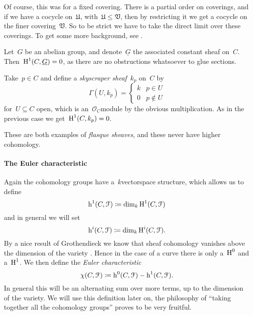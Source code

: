 \documentclass[10pt,a4paper]{article}
\begin{document}
Of course, this was for a fixed covering. There is a partial order on coverings, and if we have a cocycle on~$\mathfrak{U}$, with~$\mathfrak{U}\leq\mathfrak{V}$, then by restricting it we get a cocycle on the finer covering~$\mathfrak{V}$. So to be strict we have to take the direct limit over these coverings. To get some more background, see \cite[exercises III.4.4 and III.4.11]{hartshorne-algebraic-geometry}.

\begin{example}
  Let~$G$ be an abelian group, and denote~$\underline{G}$ the associated constant sheaf on~$C$. Then~$\operatorname{H}^1(C,\underline{G})=0$, as there are no obstructions whatsoever to glue sections.
\end{example}
\begin{example}
  Take~$p\in C$ and define a \emph{skyscraper sheaf}~$k_p$ on~$C$ by
  \begin{equation}
    \Gamma(U,k_p)=
    \begin{cases}
      k & p\in U \\
      0 & p\notin U
    \end{cases}
  \end{equation}
  for~$U\subseteq C$ open, which is an~$\mathcal{O}_C$\dash module by the obvious multiplication. As in the previous case we get~$\operatorname{H}^1(C,k_p)=0$.
\end{example}
These are both examples of \emph{flasque sheaves}, and these never have higher cohomology.

\paragraph{The Euler characteristic}
Again the cohomology groups have a~$k$\dash vectorspace structure, which allows us to define
\begin{equation}
  \operatorname{h}^1(C,\mathcal{F})\coloneqq\dim_k\operatorname{H}^1(C,\mathcal{F})
\end{equation}
and in general we will set
\begin{equation}
  \operatorname{h}^i(C,\mathcal{F})\coloneqq\dim_k\operatorname{H}^i(C,\mathcal{F}).
\end{equation}
By a nice result of Grothendieck we know that sheaf cohomology vanishes above the dimension of the variety \cite[theorem III.2.7]{hartshorne-algebraic-geometry}. Hence in the case of a curve there is only a~$\operatorname{H}^0$ and a~$\operatorname{H}^1$. We then define the \emph{Euler characteristic}
\begin{equation}
  \chi(C,\mathcal{F})\coloneqq\operatorname{h}^0(C,\mathcal{F})-\operatorname{h}^1(C,\mathcal{F}).
\end{equation}
In general this will be an alternating sum over more terms, up to the dimension of the variety. We will use this definition later on, the philosophy of ``taking together all the cohomology groups'' proves to be very fruitful.
\end{document}
